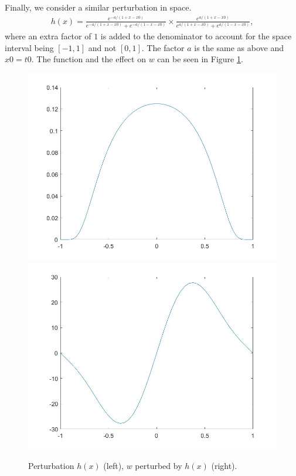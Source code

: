 \documentclass[11pt, a4paper]{article}
\theoremstyle{definition}
\begin{document}
Finally, we consider a similar perturbation in space. 
\begin{align*}
h(x) = \frac{e^{-a/(1+x-x0)}}{e^{-a/(1+x-x0)}+ e^{-a/(1-x-x0)}} \times \frac{e^{a/(1+x-x0)}}{e^{a/(1+x-x0)}+ e^{a/(1-x-x0)}},
\end{align*}
where an extra factor of $1$ is added to the denominator to account for the space interval being $[-1,1]$ and not $[0,1]$. The factor $a$ is the same as above and $x0 = t0$. The function and the effect on $w$ can be seen in Figure \ref{ypert1}.
\begin{figure}[h]
	\includegraphics[scale=0.3]{yPert1.jpg}
	\includegraphics[scale=0.3]{wperty1.jpg}
	\caption{Perturbation $h(x)$ (left), $w$ perturbed by $h(x)$ (right).}
	\label{ypert1}
\end{figure}
\end{document}

